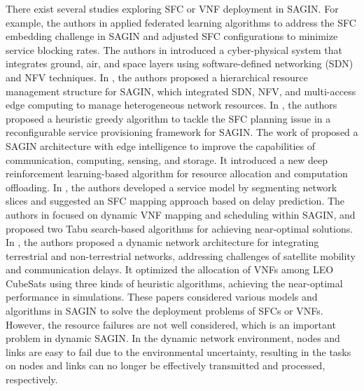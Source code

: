 There exist several studies exploring SFC or VNF deployment in SAGIN. For example, the authors in \cite{9951143} applied federated learning algorithms to address the SFC embedding challenge in SAGIN and adjusted SFC configurations to minimize service blocking rates. The authors in \cite{AKYILDIZ2019134} introduced a cyber-physical system that integrates ground, air, and space layers using software-defined networking (SDN) and NFV techniques. In \cite{fi16010027}, the authors proposed a hierarchical resource management structure for SAGIN, which integrated SDN, NFV, and multi-access edge computing to manage heterogeneous network resources. In \cite{9062531}, the authors proposed a heuristic greedy algorithm to tackle the SFC planning issue in a reconfigurable service provisioning framework for SAGIN. The work of \cite{10398221} proposed a SAGIN architecture with edge intelligence to improve the capabilities of communication, computing, sensing, and storage. It introduced a new deep reinforcement learning-based algorithm for resource allocation and computation offloading. In \cite{9749937}, the authors developed a service model by segmenting network slices and suggested an SFC mapping approach based on delay prediction. The authors in \cite{9351537} focused on dynamic VNF mapping and scheduling within SAGIN, and proposed two Tabu search-based algorithms for achieving near-optimal solutions. In \cite{10123085}, the authors proposed a dynamic network architecture for integrating terrestrial and non-terrestrial networks, addressing challenges of satellite mobility and communication delays. It optimized the allocation of VNFs among LEO CubeSats using three kinds of heuristic algorithms, achieving the near-optimal performance in simulations. These papers considered various models and algorithms in SAGIN to solve the deployment problems of SFCs or VNFs. However, the resource failures are not well considered, which is an important problem in dynamic SAGIN. In the dynamic network environment, nodes and links are easy to fail due to the environmental uncertainty, resulting in the tasks on nodes and links can no longer be effectively transmitted and processed, respectively.

